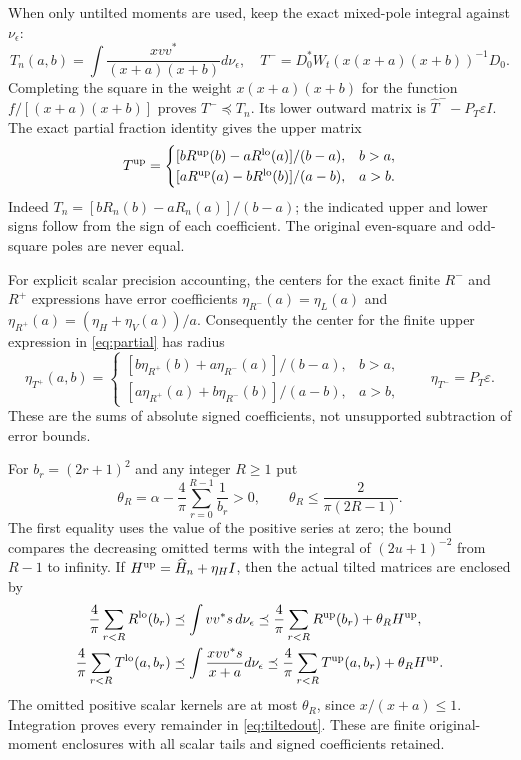 \documentclass[11pt]{article}
\begin{document}
When only untilted moments are used, keep the exact mixed-pole
integral against $\nu_\epsilon$:
\[
 T_n(a,b)=\int\frac{xvv^*}{(x+a)(x+b)}d\nu_\epsilon,
 \quad T^- =D_0^*W_t(x(x+a)(x+b))^{-1}D_0.
\]
Completing the square in the weight $x(x+a)(x+b)$ for the
function $f/[(x+a)(x+b)]$ proves $T^-\preceq T_n$.
Its lower outward matrix is $\widehat T^--P_T\varepsilon I$.
The exact partial fraction identity gives the upper matrix
\begin{equation}\label{eq:partial}
 T^{\rm up}=
 \begin{cases}
 [bR^{\rm up}(b)-aR^{\rm lo}(a)]/(b-a),&b>a,\\
 [aR^{\rm up}(a)-bR^{\rm lo}(b)]/(a-b),&a>b.
 \end{cases}
\end{equation}
Indeed $T_n=[bR_n(b)-aR_n(a)]/(b-a)$; the indicated upper
and lower signs follow from the sign of each coefficient. The
original even-square and odd-square poles are never equal.

For explicit scalar precision accounting, the centers for the
exact finite $R^-$ and $R^+$ expressions have error coefficients
$\eta_{R^-}(a)=\eta_L(a)$ and
$\eta_{R^+}(a)=(\eta_H+\eta_V(a))/a$. Consequently the
center for the finite upper expression in \eqref{eq:partial}
has radius
\[
 \eta_{T^+}(a,b)=
 \begin{cases}
 [b\eta_{R^+}(b)+a\eta_{R^-}(a)]/(b-a),&b>a,\\
 [a\eta_{R^+}(a)+b\eta_{R^-}(b)]/(a-b),&a>b,
 \end{cases}
 \qquad \eta_{T^-}=P_T\varepsilon.
\]
These are the sums of absolute signed coefficients, not
unsupported subtraction of error bounds.

For $b_r=(2r+1)^2$ and any integer $R\ge1$ put
\[
 \theta_R=\alpha-\frac4\pi\sum_{r=0}^{R-1}\frac1{b_r}>0,
 \qquad\theta_R\le\frac2{\pi(2R-1)}.
\]
The first equality uses the value of the positive series at zero;
the bound compares the decreasing omitted terms with the integral
of $(2u+1)^{-2}$ from $R-1$ to infinity. If
$H^{\rm up}=\widehat H_n+\eta_HI$, then the actual tilted
matrices are enclosed by
\begin{equation}\label{eq:tiltedout}
 \begin{aligned}
 \frac4\pi\sum_{r<R}R^{\rm lo}(b_r)
 &\preceq \int vv^*s\,d\nu_\epsilon
 \preceq\frac4\pi\sum_{r<R}R^{\rm up}(b_r)+\theta_RH^{\rm up},\\
 \frac4\pi\sum_{r<R}T^{\rm lo}(a,b_r)
 &\preceq \int\frac{xvv^*s}{x+a}d\nu_\epsilon
 \preceq\frac4\pi\sum_{r<R}T^{\rm up}(a,b_r)+\theta_RH^{\rm up}.
 \end{aligned}
\end{equation}
The omitted positive scalar kernels are at most $\theta_R$,
since $x/(x+a)\le1$. Integration proves every remainder in
\eqref{eq:tiltedout}. These are finite original-moment enclosures
with all scalar tails and signed coefficients retained.
\end{document}
